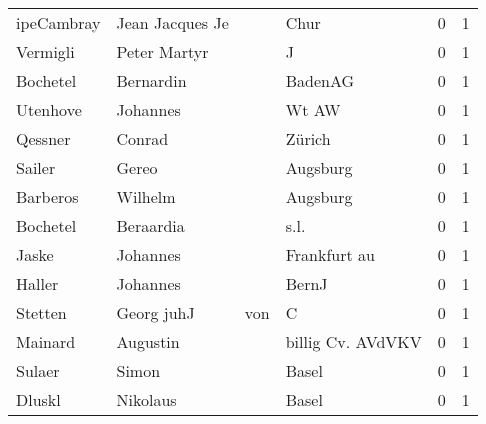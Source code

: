 \begin{tabular}{llllrr}
               ipeCambray &                    Jean Jacques Je &             &                                        Chur &          0 &         1 \\
                 Vermigli &                       Peter Martyr &             &                                           J &          0 &         1 \\
                 Bochetel &                          Bernardin &             &                                     BadenAG &          0 &         1 \\
                 Utenhove &                           Johannes &             &                                       Wt AW &          0 &         1 \\
                  Qessner &                             Conrad &             &                                      Zürich &          0 &         1 \\
                   Sailer &                              Gereo &             &                                    Augsburg &          0 &         1 \\
                 Barberos &                            Wilhelm &             &                                    Augsburg &          0 &         1 \\
                 Bochetel &                          Beraardia &             &                                        s.l. &          0 &         1 \\
                    Jaske &                           Johannes &             &                                Frankfurt au &          0 &         1 \\
                   Haller &                           Johannes &             &                                       BernJ &          0 &         1 \\
                  Stetten &                        Georg  juhJ &         von &                                           C &          0 &         1 \\
                  Mainard &                           Augustin &             &                           billig Cv. AVdVKV &          0 &         1 \\
                   Sulaer &                              Simon &             &                                       Basel &          0 &         1 \\
                   Dluskl &                           Nikolaus &             &                                       Basel &          0 &         1 \\

\end{tabular}
